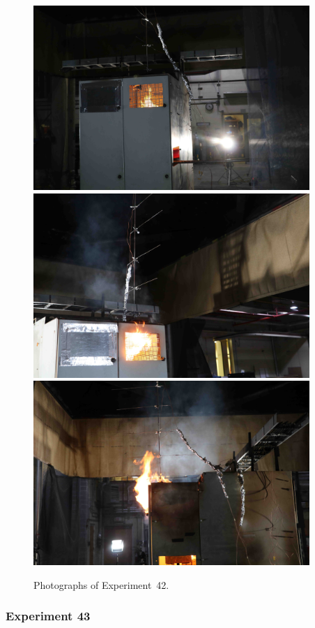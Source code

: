 \documentclass[12pt]{article}
\begin{document}
\begin{figure}[p]
\centering
\includegraphics[height=2.75in]{../FIGURES/Test_42_start} \\
\includegraphics[height=2.75in]{../FIGURES/Test_42_rear} \\
\includegraphics[height=2.75in]{../FIGURES/Test_42_side}
\caption[Photographs of Experiment~42]{Photographs of Experiment~42.}
\label{fig:Test_42_photos}
\end{figure}


\clearpage

\subsubsection{Experiment 43}
\end{document}
